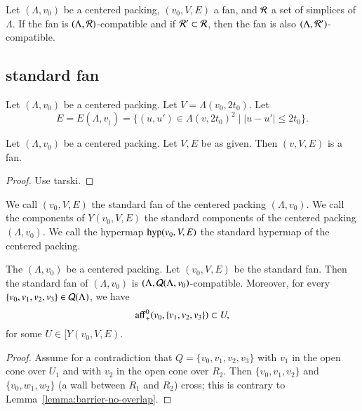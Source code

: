 \begin{lemma}
Let $(\Lambda,v_0)$ be a centered packing, $(v_0,V,E)$ a fan, and ${\mathcal R}$ a set of simplices of $\Lambda$.
If the fan is $(\Lambda,{\mathcal R})$-compatible and if
 ${\mathcal R}'\subset{\mathcal R}$, then the fan is also $(\Lambda,{\mathcal R}')$-compatible.
\end{lemma}

\subsection{standard fan}

Let $(\Lambda,v_0)$ be a centered packing.  
Let $V=\Lambda(v_0,2t_0)$.
Let 
$$E = E(\Lambda,v_)) = \{(u,u')\in \Lambda(v,2t_0)^2 \mid |u-u'|\le 2t_0\}.
$$


\begin{lemma}
Let $(\Lambda,v_0)$ be a centered packing.  Let $V,E$ be as given.
Then $(v,V,E)$ is a fan.
\end{lemma}

\begin{proof}
Use tarski.
\end{proof}

\begin{definition}  
We call $(v_0,V,E)$ the standard
fan of the centered packing $(\Lambda,v_0)$.   We call the
components of $Y(v_0,V,E)$ the standard components of the centered
packing $(\Lambda,v_0)$.  We call the hypermap ${\operatorname{hyp}}(v_0,V,E)$
the standard hypermap of the centered packing.  
\end{definition}

\begin{lemma}
The $(\Lambda,v_0)$ be a centered packing.  Let $(v_0,V,E)$ be the
standard fan.  Then the standard fan of $(\Lambda,v_0)$ is
$(\Lambda,{\mathcal Q}(\Lambda,v_0)$-compatible. Moreover,
for every $\{v_0,v_1,v_2,v_3\}\in{\mathcal Q}(\Lambda)$, we have
$$
 {\operatorname{aff}}_+^0(v_0,\{v_1,v_2,v_3\})\subset U,
$$
for some $U\in[Y(v_0,V,E)$.
\end{lemma}

\begin{proof}  Assume for a contradiction that $Q=\{v_0,v_1,v_2,v_3\}$
with $v_1$ in the open cone over $U_1$ and with $v_2$ in the open
cone over $R_2$.  Then $\{v_0,v_1,v_2\}$ and $\{v_0,w_1,w_2\}$ (a wall
between $R_1$ and $R_2$) cross;  this is contrary to
Lemma~\ref{lemma:barrier-no-overlap}.
\end{proof}


